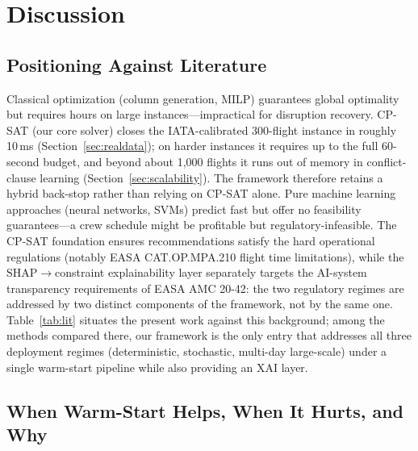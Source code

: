 \documentclass[12pt,number]{elsarticle}
\begin{document}
\section{Discussion}
\label{sec:discussion}

\subsection{Positioning Against Literature}

Classical optimization (column generation, MILP) guarantees global optimality but requires hours on large instances---impractical for disruption recovery. CP-SAT (our core solver) closes the IATA-calibrated 300-flight instance in roughly 10\,ms (Section~\ref{sec:realdata}); on harder instances it requires up to the full 60-second budget, and beyond about 1{,}000 flights it runs out of memory in conflict-clause learning (Section~\ref{sec:scalability}). The framework therefore retains a hybrid back-stop rather than relying on CP-SAT alone. Pure machine learning approaches (neural networks, SVMs) predict fast but offer no feasibility guarantees---a crew schedule might be profitable but regulatory-infeasible. The CP-SAT foundation ensures recommendations satisfy the hard operational regulations (notably EASA CAT.OP.MPA.210 flight time limitations), while the SHAP$\rightarrow$constraint explainability layer separately targets the AI-system transparency requirements of EASA AMC 20-42: the two regulatory regimes are addressed by two distinct components of the framework, not by the same one. Table~\ref{tab:lit} situates the present work against this background; among the methods compared there, our framework is the only entry that addresses all three deployment regimes (deterministic, stochastic, multi-day large-scale) under a single warm-start pipeline while also providing an XAI layer.

\subsection{When Warm-Start Helps, When It Hurts, and Why}
\end{document}
